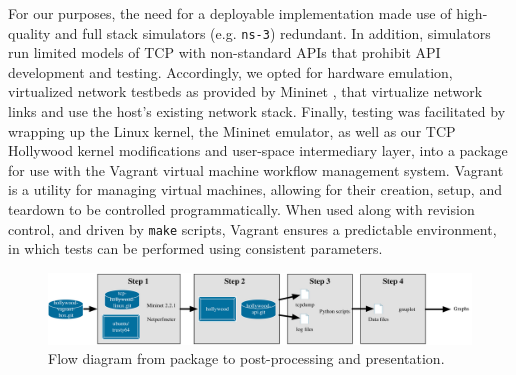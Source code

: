 For our purposes, the need for a deployable implementation made use of
high-quality and full stack simulators (e.g. \texttt{ns-3}) redundant. In
addition, simulators run limited models of TCP with non-standard APIs that
prohibit API development and testing.
Accordingly, we opted for hardware emulation, virtualized network testbeds
as provided by Mininet \cite{handigol:2012:reproducible}, that virtualize
network links and use the host's existing network stack.
Finally, testing was facilitated by wrapping up the Linux kernel, the Mininet
emulator, as well as our TCP Hollywood kernel modifications and user-space
intermediary layer, into a package for use with the Vagrant virtual machine
workflow management system.  Vagrant is a utility for managing virtual machines,
allowing for their creation, setup, and teardown to be controlled
programmatically. When used along with revision control, and driven by
\texttt{make} scripts, Vagrant ensures a predictable environment, in which tests
can be performed using consistent parameters.

\begin{figure}[t!]
  \centering
	\includegraphics[width=\linewidth]{figures/reproducibility-flow.pdf}
    \caption{Flow diagram from package to post-processing and presentation.}
   	\label{fig:reproducibility-flow}
\end{figure}

